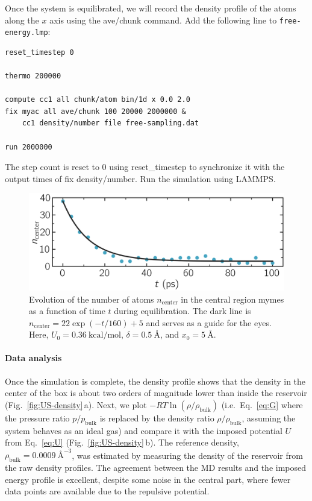 \documentclass[9pt,tutorial]{livecoms}
\newcommand{\lmpcmd}[1]{\hspace{0pt}\colorbox{listing}{\textcolor{command}{\small{#1}}}\hspace{0pt}} %
\newcommand{\flecmd}[1]{\textcolor{command}{\texttt{#1}}} %
\begin{document}
Once the system is equilibrated, we will record the density profile of
the atoms along the $x$ axis using the \lmpcmd{ave/chunk} command.
Add the following line to \flecmd{free-energy.lmp}:
\begin{lstlisting}
reset_timestep 0

thermo 200000

compute cc1 all chunk/atom bin/1d x 0.0 2.0
fix myac all ave/chunk 100 20000 2000000 &
    cc1 density/number file free-sampling.dat

run 2000000
\end{lstlisting}
The step count is reset to 0 using \lmpcmd{reset\_timestep} to synchronize it
with the output times of \lmpcmd{fix density/number}.  Run the simulation using
LAMMPS.

\begin{figure}
\centering
\includegraphics[width=\linewidth]{US-density-evolution}
\caption{Evolution of the number of atoms $n_\text{center}$ in the central
region \lmpcmd{mymes} as a function of time $t$ during equilibration.  The dark line
is $n_\text{center} = 22 \exp(-t/160)+5$ and serves as a guide for the eyes.  Here, $U_0 = 0.36~\text{kcal/mol}$,
$\delta = 0.5~\text{\AA{}}$, and $x_0 = 5~\text{\AA{}}$.}
\label{fig:US-density-evolution}
\end{figure}

\paragraph{Data analysis}

Once the simulation is complete, the density profile shows that the density in the center of the box is
about two orders of magnitude lower than inside the reservoir (Fig.~\ref{fig:US-density}\,a).
Next, we plot $-R T \ln(\rho/\rho_\mathrm{bulk})$ (i.e.~Eq.~\eqref{eq:G} where
the pressure ratio $p/p_\mathrm{bulk}$ is replaced by the density ratio
$\rho/\rho_\mathrm{bulk}$, assuming the system behaves as an ideal gas) and compare it
with the imposed potential $U$ from Eq.~\eqref{eq:U} (Fig.~\ref{fig:US-density}\,b).
The reference density, $\rho_\text{bulk} = 0.0009~\text{\AA{}}^{-3}$,
was estimated by measuring the density of the reservoir from the raw density
profiles.  The agreement between the MD results and the imposed energy profile
is excellent, despite some noise in the central part, where fewer data points
are available due to the repulsive potential.
\end{document}
